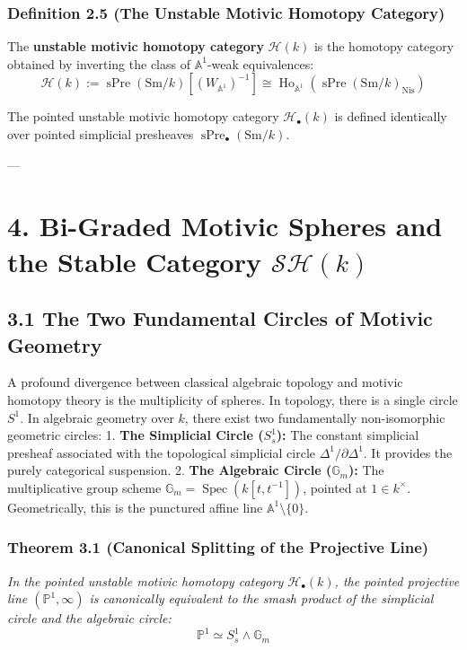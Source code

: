 \documentclass[11pt,twoside,openright]{amsbook}
\begin{document}
{\subsubsection{Definition 2.5 (The Unstable Motivic Homotopy Category)}
The \textbf{unstable motivic homotopy category} $\mathcal{H}(k)$ is the homotopy category obtained by inverting the class of $\mathbb{A}^1$-weak equivalences:
$$\mathcal{H}(k) := \operatorname{sPre}(\mathrm{Sm}/k)\left[ (W_{\mathbb{A}^1})^{-1} \right] \cong \operatorname{Ho}_{\mathbb{A}^1}\left(\operatorname{sPre}(\mathrm{Sm}/k)_{\mathrm{Nis}}\right)$$

The pointed unstable motivic homotopy category $\mathcal{H}_{\bullet}(k)$ is defined identically over pointed simplicial presheaves $\operatorname{sPre}_{\bullet}(\mathrm{Sm}/k)$.

---

\section{4. Bi-Graded Motivic Spheres and the Stable Category $\mathcal{SH}(k)$}

\subsection{3.1 The Two Fundamental Circles of Motivic Geometry}
A profound divergence between classical algebraic topology and motivic homotopy theory is the multiplicity of spheres. In topology, there is a single circle $S^1$. In algebraic geometry over $k$, there exist two fundamentally non-isomorphic geometric circles:
1. \textbf{The Simplicial Circle ($S^1_s$):} The constant simplicial presheaf associated with the topological simplicial circle $\Delta^1 / \partial \Delta^1$. It provides the purely categorical suspension.
2. \textbf{The Algebraic Circle ($\mathbb{G}_m$):} The multiplicative group scheme $\mathbb{G}_m = \operatorname{Spec}(k[t, t^{-1}])$, pointed at $1 \in k^\times$. Geometrically, this is the punctured affine line $\mathbb{A}^1 \setminus \{0\}$.

\subsubsection{Theorem 3.1 (Canonical Splitting of the Projective Line)}
\textit{In the pointed unstable motivic homotopy category $\mathcal{H}_{\bullet}(k)$, the pointed projective line $(\mathbb{P}^1, \infty)$ is canonically equivalent to the smash product of the simplicial circle and the algebraic circle:}
$$\mathbb{P}^1 \simeq S^1_s \wedge \mathbb{G}_m$$

}
\end{document}
